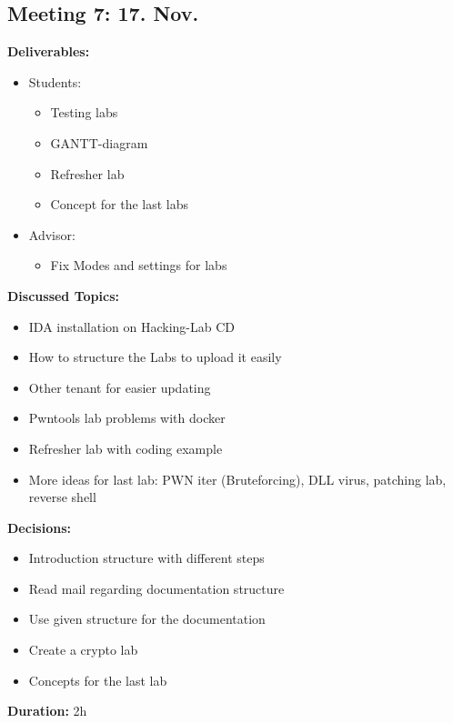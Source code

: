 \subsection*{Meeting 7: 17. Nov.}
\textbf{Deliverables:}
\begin{itemize}
    \item Students:
    \begin{itemize}
        \item Testing labs
        \item GANTT-diagram
        \item Refresher lab
        \item Concept for the last labs
    \end{itemize}
    \item Advisor:
    \begin{itemize}
        \item Fix Modes and settings for labs
    \end{itemize}
\end{itemize} 
\textbf{Discussed Topics:}
\begin{itemize}
    \item IDA installation on Hacking-Lab CD
    \item How to structure the Labs to upload it easily
    \item Other tenant for easier updating
    \item Pwntools lab problems with docker
    \item Refresher lab with coding example
    \item More ideas for last lab: PWN iter (Bruteforcing), DLL virus, patching lab, reverse shell
\end{itemize}
\textbf{Decisions:}
\begin{itemize}
    \item Introduction structure with different steps
    \item Read mail regarding documentation structure
    \item Use given structure for the documentation
    \item Create a crypto lab
    \item Concepts for the last lab
\end{itemize}
\textbf{Duration:} 2h

\newpage
